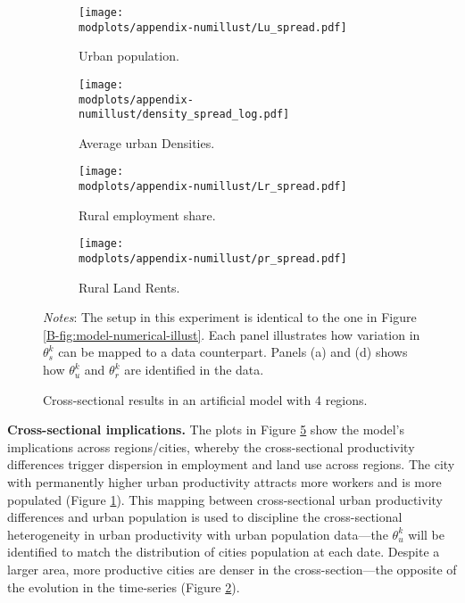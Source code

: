 \documentclass[11pt]{report}
\newcommand{\round}{revision3}  %
\newcommand{\modplots}{../../output/model/plots/\round}
\newcommand{\ptwo}{0.5}  %
\begin{document}
\begin{figure}[h!]
	\begin{adjustbox}{center}
		\parbox{\textwidth}{\lineskip=0pt
			\begin{subfigure}{\ptwo\textwidth}
				\texttt{[image: \\modplots/appendix-numillust/Lu\_spread.pdf]}
				\caption{Urban population.\label{B-fig:model-numerical-xsect-Lu}}
			\end{subfigure}%
			\begin{subfigure}{\ptwo\textwidth}
				\texttt{[image: \\modplots/appendix-numillust/density\_spread\_log.pdf]}
				\caption{Average urban Densities.\label{B-fig:model-numerical-xsect-densities}}
			\end{subfigure}
			
			\begin{subfigure}{\ptwo\textwidth}
				\texttt{[image: \\modplots/appendix-numillust/Lr\_spread.pdf]}
				\caption{Rural employment share.\label{B-fig:model-numerical-xsect-Lrshare}}
			\end{subfigure}%
			\begin{subfigure}{\ptwo\textwidth}
				\texttt{[image: \\modplots/appendix-numillust/ρr\_spread.pdf]}
				\caption{Rural Land Rents.\label{B-fig:model-numerical-xsect-rho}}
			\end{subfigure}
			
		}
	\end{adjustbox}
	\caption{Cross-sectional results in an artificial model with 4 regions.\label{B-fig:model-numerical-xsec}}
	{\footnotesize \textit{Notes}: The setup in this experiment is identical to the one in Figure \ref{B-fig:model-numerical-illust}. Each panel illustrates how variation in $\theta_s^k$ can be mapped to a data counterpart. Panels (a) and (d) shows how $\theta_u^k$ and $\theta_r^k$ are identified in the data.}
\end{figure}


\textbf{Cross-sectional implications.} The plots in Figure \ref{B-fig:model-numerical-xsec} show the model's implications across regions/cities, whereby the cross-sectional productivity differences trigger dispersion in employment and land use across regions. The city with permanently higher urban productivity attracts more workers and is more populated (Figure \ref{B-fig:model-numerical-xsect-Lu}). This mapping between cross-sectional urban productivity differences and urban population is used to discipline the cross-sectional heterogeneity in urban productivity with urban population data---the $\theta_{u}^k$ will be identified to match the distribution of cities population at each date. Despite a larger area, more productive cities are denser in the cross-section---the opposite of the evolution in the time-series (Figure \ref{B-fig:model-numerical-xsect-densities}). 
\end{document}
